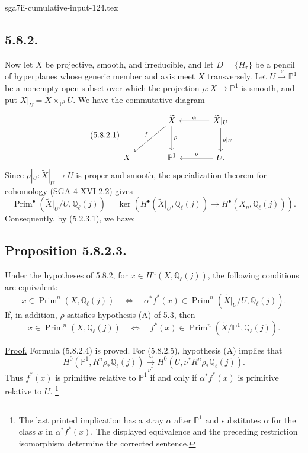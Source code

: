 \begin{filecontents*}{sga7ii-cumulative-input-124.tex}
\subsection*{5.8.2.}
Now let $X$ be projective, smooth, and irreducible, and let
$D=\{H_\tau\}$ be a pencil of hyperplanes whose generic member and axis
meet $X$ transversely.  Let
$U\xrightarrow{\nu}\mathbb P^1$ be a nonempty open subset over which the
projection $\rho:\widetilde X\to\mathbb P^1$ is smooth, and put
$\widetilde X|_U=\widetilde X\times_{\mathbb P^1}U$.  We have the
commutative diagram
\begin{equation}\tag{5.8.2.1}
\begin{tikzcd}[column sep=large,row sep=large]
{}
&
\widetilde X
  \arrow[dl,"f"']
  \arrow[d,"\rho"]
&
\widetilde X|_U
  \arrow[l,"\alpha"']
  \arrow[d,"\rho|_U"]
\\
X
&
\mathbb P^1
&
U\arrow[l,"\nu"'].
\end{tikzcd}
\end{equation}
Since $\rho|_U:\widetilde X|_U\to U$ is proper and smooth, the
specialization theorem for cohomology (SGA 4 XVI 2.2) gives
\begin{equation}\tag{5.8.2.2}
\operatorname{Prim}^\bullet(\widetilde X|_U/U,\mathbb Q_\ell(j))
=\ker\!\left(
H^\bullet(\widetilde X|_U,\mathbb Q_\ell(j))
\longrightarrow H^\bullet(X_{\bar\eta},\mathbb Q_\ell(j))
\right).
\end{equation}
Consequently, by (5.2.3.1), we have:

\subsection*{Proposition 5.8.2.3.}
\underline{Under the hypotheses of 5.8.2, for
$x\in H^n(X,\mathbb Q_\ell(j))$, the following conditions are equivalent:}
\begin{equation}\tag{5.8.2.4}
x\in\operatorname{Prim}^n(X,\mathbb Q_\ell(j))
\quad\Longleftrightarrow\quad
\alpha^*f^*(x)\in
\operatorname{Prim}^n(\widetilde X|_U/U,\mathbb Q_\ell(j)).
\end{equation}
\underline{If, in addition, $\rho$ satisfies hypothesis (A) of 5.3, then}
\begin{equation}\tag{5.8.2.5}
x\in\operatorname{Prim}^n(X,\mathbb Q_\ell(j))
\quad\Longleftrightarrow\quad
f^*(x)\in
\operatorname{Prim}^n(\widetilde X/\mathbb P^1,\mathbb Q_\ell(j)).
\end{equation}

\underline{Proof.}
Formula (5.8.2.4) is proved.  For (5.8.2.5), hypothesis (A) implies that
\[
H^0(\mathbb P^1,R^n\rho_*\mathbb Q_\ell(j))
\xrightarrow[\nu^*]{\sim}
H^0(U,\nu^*R^n\rho_*\mathbb Q_\ell(j)).
\]
Thus $f^*(x)$ is primitive relative to $\mathbb P^1$ if and only if
$\alpha^*f^*(x)$ is primitive relative to $U$.
\footnote{The last printed implication has a stray $\alpha$ after
$\mathbb P^1$ and substitutes $\alpha$ for the class $x$ in
$\alpha^*f^*(x)$.  The displayed equivalence and the preceding restriction
isomorphism determine the corrected sentence.}


\end{filecontents*}

